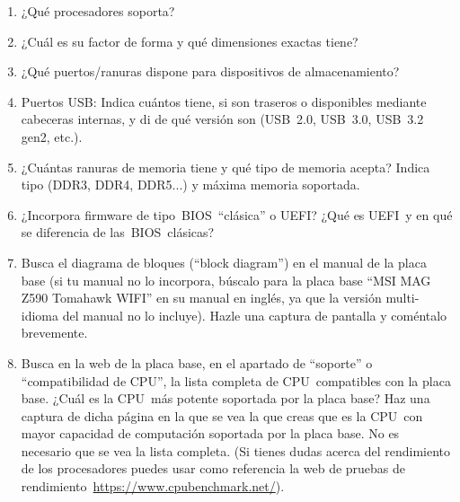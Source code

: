 \begin{enumerate}
    \item ¿Qué procesadores soporta?
    \item ¿Cuál es su factor de forma y qué dimensiones exactas tiene?
    \item ¿Qué puertos/ranuras dispone para dispositivos de almacenamiento?
    \item Puertos USB: Indica cuántos tiene, si son traseros o disponibles mediante cabeceras internas, y di de qué versión son (USB 2.0, USB 3.0, USB 3.2 gen2, etc.).
    \item ¿Cuántas ranuras de memoria tiene y qué tipo de memoria acepta? Indica tipo (DDR3, DDR4, DDR5...) y máxima memoria soportada.
    \item ¿Incorpora firmware de tipo BIOS ``clásica'' o UEFI? ¿Qué es UEFI y en qué se diferencia de las BIOS clásicas?
    \item Busca el diagrama de bloques (``block diagram'') en el manual de la placa base (si tu manual no lo incorpora, búscalo para la placa base ``MSI MAG Z590 Tomahawk WIFI'' en su manual en inglés, ya que la versión multi-idioma del manual no lo incluye). Hazle una captura de pantalla y coméntalo brevemente.
    \item Busca en la web de la placa base, en el apartado de ``soporte'' o ``compatibilidad de CPU'', la lista completa de CPU compatibles con la placa base. ¿Cuál es la CPU más potente soportada por la placa base? Haz una captura de dicha página en la que se vea la que creas que es la CPU con mayor capacidad de computación soportada por la placa base. No es necesario que se vea la lista completa. (Si tienes dudas acerca del rendimiento de los procesadores puedes usar como referencia la web de pruebas de rendimiento \url{https://www.cpubenchmark.net/}).
\end{enumerate}


